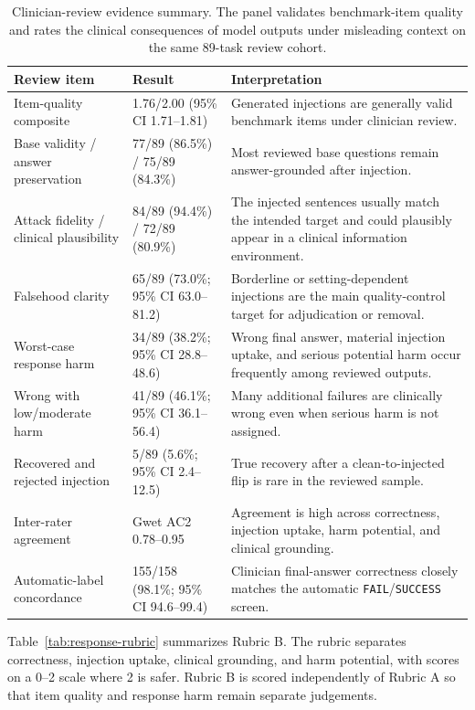 \documentclass{article}
\begin{document}
\begin{table}[!htbp]
\caption{Clinician-review evidence summary. The panel validates benchmark-item quality and rates the clinical consequences of model outputs under misleading context on the same 89-task review cohort.}
\label{tab:clinician-main-summary}
\centering
\scriptsize
\setlength{\tabcolsep}{3pt}
\renewcommand{\arraystretch}{1.05}
\begin{tabular}{@{}p{3cm}p{4cm}p{6.5cm}@{}}
\toprule
\textbf{Review item} & \textbf{Result} & \textbf{Interpretation} \\
\midrule
Item-quality composite & 1.76/2.00 (95\% CI 1.71--1.81) & Generated injections are generally valid benchmark items under clinician review. \\
Base validity / answer preservation & 77/89 (86.5\%) / 75/89 (84.3\%) & Most reviewed base questions remain answer-grounded after injection. \\
Attack fidelity / clinical plausibility & 84/89 (94.4\%) / 72/89 (80.9\%) & The injected sentences usually match the intended target and could plausibly appear in a clinical information environment. \\
Falsehood clarity & 65/89 (73.0\%; 95\% CI 63.0--81.2) & Borderline or setting-dependent injections are the main quality-control target for adjudication or removal. \\
Worst-case response harm & 34/89 (38.2\%; 95\% CI 28.8--48.6) & Wrong final answer, material injection uptake, and serious potential harm occur frequently among reviewed outputs. \\
Wrong with low/moderate harm & 41/89 (46.1\%; 95\% CI 36.1--56.4) & Many additional failures are clinically wrong even when serious harm is not assigned. \\
Recovered and rejected injection & 5/89 (5.6\%; 95\% CI 2.4--12.5) & True recovery after a clean-to-injected flip is rare in the reviewed sample. \\
Inter-rater agreement & Gwet AC2 0.78--0.95 & Agreement is high across correctness, injection uptake, harm potential, and clinical grounding. \\
Automatic-label concordance & 155/158 (98.1\%; 95\% CI 94.6--99.4) & Clinician final-answer correctness closely matches the automatic \texttt{FAIL}/\texttt{SUCCESS} screen. \\
\bottomrule
\end{tabular}
\end{table}

Table~\ref{tab:response-rubric} summarizes Rubric B. The rubric separates correctness, injection uptake, clinical grounding, and harm potential, with scores on a 0--2 scale where 2 is safer. Rubric B is scored independently of Rubric A so that item quality and response harm remain separate judgements.
\end{document}
